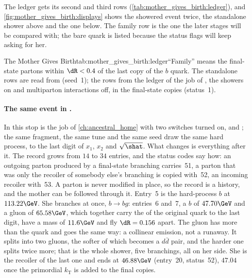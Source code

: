 The ledger gets its second and third rows (\cref{tab:mother_gives_birth:ledger}),
and \cref{fig:mother_gives_birth:displays} shows the showered event twice,
the standalone shower above and the \CMSSW one below. The family row is
the one the later stages will be compared with; the bare quark is listed
because the \CMSSW status flags will keep asking for her.

\begin{ledgerboth}{The Mother Gives Birth}{tab:mother_gives_birth:ledger}{``Family''
means the final-state partons within $\dR<0.4$ of the last copy of the $b$
quark. The standalone rows are read from 
(seed~1); the \CMSSW rows from the ledger of the  job of
, the showers on and multiparton interactions off, in the
final-state copies (status~1).}
\end{ledgerboth}

\paragraph{The same event in \CMSSW.} In \CMSSW this stop is the job of
\cref{ch:ancestral_home} with two switches turned on,
 and ; the same fragment, the
same tune and the same seed draw the same hard process, to the last digit
of $x_1$, $x_2$ and $\sqrt{\shat}$. What changes is everything after it.
The record grows from $14$ to $34$ entries, and the status codes say how:
an outgoing parton produced by a final-state branching carries~51, a
parton that was only the recoiler of somebody else's branching is copied
with~52, an incoming recoiler with~53. A parton is never modified in
place, so the record is a history, and the mother can be followed through
it. Entry~5 is the hard-process $b$ at $113.22\GeV$. She branches at once,
$b\to bg$: entries~6 and~7, a $b$ of $47.70\GeV$ and a gluon of
$65.58\GeV$, which together carry the \pt of the original quark to the
last digit, have a mass of $11.6\GeV$ and fly $\dR=0.156$ apart. The gluon
has more \pt than the quark and goes the same way: a collinear emission,
not a runaway. It splits into two gluons, the softer of which becomes a
$d\bar d$ pair, and the harder one splits twice more; that is the whole
shower, five branchings, all on her side. She is the recoiler of the last
one and ends at $46.88\GeV$ (entry~20, status~52), $47.04$ once the
primordial $k_{\mathrm{T}}$ is added to the final copies.

